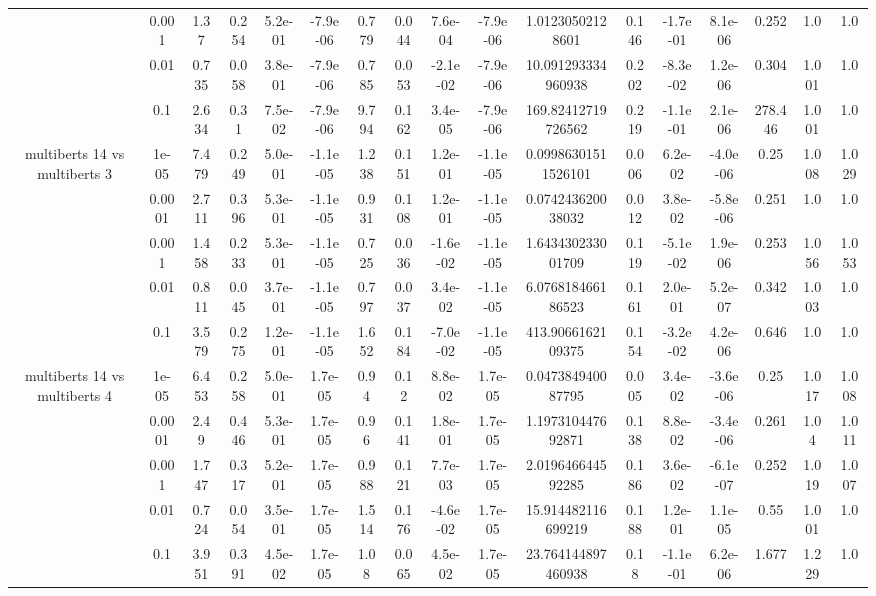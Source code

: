 \begin{tabular}{|c|c|c|c|c|c|c|c|c|c|c|c|c|c|c|c|c|}
 & 0.001 & 1.37 & 0.254 & 5.2e-01 & -7.9e-06 & 0.779 & 0.044 & 7.6e-04 & -7.9e-06 & 1.01230502128601 & 0.146 & -1.7e-01 & 8.1e-06 & 0.252 & 1.0 & 1.0 \\
 & 0.01 & 0.735 & 0.058 & 3.8e-01 & -7.9e-06 & 0.785 & 0.053 & -2.1e-02 & -7.9e-06 & 10.091293334960938 & 0.202 & -8.3e-02 & 1.2e-06 & 0.304 & 1.001 & 1.0 \\
 & 0.1 & 2.634 & 0.31 & 7.5e-02 & -7.9e-06 & 9.794 & 0.162 & 3.4e-05 & -7.9e-06 & 169.82412719726562 & 0.219 & -1.1e-01 & 2.1e-06 & 278.446 & 1.001 & 1.0 \\
\hline
\multirow{5}{*}{multiberts 14 vs multiberts 3} & 1e-05 & 7.479 & 0.249 & 5.0e-01 & -1.1e-05 & 1.238 & 0.151 & 1.2e-01 & -1.1e-05 & 0.09986301511526101 & 0.006 & 6.2e-02 & -4.0e-06 & 0.25 & 1.008 & 1.029 \\
 & 0.0001 & 2.711 & 0.396 & 5.3e-01 & -1.1e-05 & 0.931 & 0.108 & 1.2e-01 & -1.1e-05 & 0.074243620038032 & 0.012 & 3.8e-02 & -5.8e-06 & 0.251 & 1.0 & 1.0 \\
 & 0.001 & 1.458 & 0.233 & 5.3e-01 & -1.1e-05 & 0.725 & 0.036 & -1.6e-02 & -1.1e-05 & 1.643430233001709 & 0.119 & -5.1e-02 & 1.9e-06 & 0.253 & 1.056 & 1.053 \\
 & 0.01 & 0.811 & 0.045 & 3.7e-01 & -1.1e-05 & 0.797 & 0.037 & 3.4e-02 & -1.1e-05 & 6.076818466186523 & 0.161 & 2.0e-01 & 5.2e-07 & 0.342 & 1.003 & 1.0 \\
 & 0.1 & 3.579 & 0.275 & 1.2e-01 & -1.1e-05 & 1.652 & 0.184 & -7.0e-02 & -1.1e-05 & 413.9066162109375 & 0.154 & -3.2e-02 & 4.2e-06 & 0.646 & 1.0 & 1.0 \\
\hline
\multirow{5}{*}{multiberts 14 vs multiberts 4} & 1e-05 & 6.453 & 0.258 & 5.0e-01 & 1.7e-05 & 0.94 & 0.12 & 8.8e-02 & 1.7e-05 & 0.047384940087795 & 0.005 & 3.4e-02 & -3.6e-06 & 0.25 & 1.017 & 1.008 \\
 & 0.0001 & 2.49 & 0.446 & 5.3e-01 & 1.7e-05 & 0.96 & 0.141 & 1.8e-01 & 1.7e-05 & 1.197310447692871 & 0.138 & 8.8e-02 & -3.4e-06 & 0.261 & 1.04 & 1.011 \\
 & 0.001 & 1.747 & 0.317 & 5.2e-01 & 1.7e-05 & 0.988 & 0.121 & 7.7e-03 & 1.7e-05 & 2.019646644592285 & 0.186 & 3.6e-02 & -6.1e-07 & 0.252 & 1.019 & 1.007 \\
 & 0.01 & 0.724 & 0.054 & 3.5e-01 & 1.7e-05 & 1.514 & 0.176 & -4.6e-02 & 1.7e-05 & 15.914482116699219 & 0.188 & 1.2e-01 & 1.1e-05 & 0.55 & 1.001 & 1.0 \\
 & 0.1 & 3.951 & 0.391 & 4.5e-02 & 1.7e-05 & 1.08 & 0.065 & 4.5e-02 & 1.7e-05 & 23.764144897460938 & 0.18 & -1.1e-01 & 6.2e-06 & 1.677 & 1.229 & 1.0 \\

\end{tabular}
